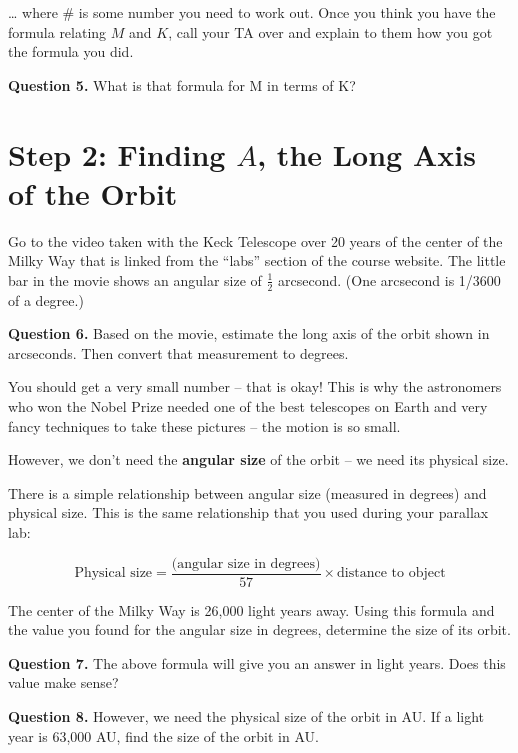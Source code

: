 \documentclass[11pt]{article}
\begin{document}
… where \# is some number you need to work out. Once you think you have the formula relating $M$ and $K$, call your TA over and explain to them how you got the formula you did.

{\bf Question 5.} What is that formula for M in terms of K?

\vspace{1in}



\section{Step 2: Finding $A$, the Long Axis of the Orbit}

Go to the video taken with the Keck Telescope over 20 years of the center of the Milky Way that is linked from the ``labs'' section of the course website. The little bar in the movie shows an angular size of $\frac{1}{2}$ arcsecond. (One arcsecond is 1/3600 of a degree.) 

{\bf Question 6.} Based on the movie, estimate the long axis of the orbit shown in arcseconds. Then convert that measurement to degrees.

\vspace{1in}

You should get a very small number -- that is okay! This is why the astronomers who won the Nobel Prize needed one of the best telescopes on Earth and very fancy techniques to take these pictures -- the motion is so small.

However, we don’t need the {\bf angular size} of the orbit -- we need its physical size. 

There is a simple relationship between angular size (measured in degrees) and physical size. This is the same relationship that you used during your parallax lab:

$$
\text{Physical size} = \frac{\text{(angular size in degrees)}}{57} \times \text{distance to object}$$

The center of the Milky Way is 26,000 light years away. Using this formula and the value you found for the angular size in degrees, determine the size of its orbit. 

{\bf Question 7.} The above formula will give you an answer in light years. Does this value make sense?

\vspace{1in}

{\bf Question 8.} However, we need the physical size of the orbit in AU. If a light year is 63,000 AU, find the size of the orbit in AU.
\end{document}
